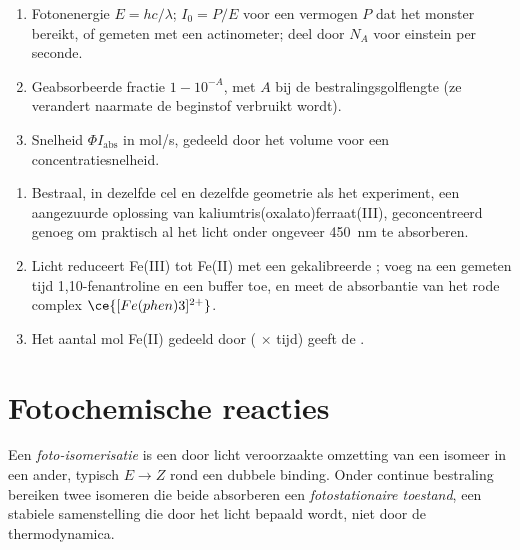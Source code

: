 \begin{method}\label{met:b3:photochemistry:photochemical-rate}
\begin{enumerate}
  \item Fotonenergie $E = hc/\lambda$;  $I_0 = P/E$ voor een
        vermogen $P$ dat het monster bereikt, of gemeten met een
        actinometer; deel door $N_A$ voor einstein per seconde.
  \item Geabsorbeerde fractie $1 - 10^{-A}$, met $A$ bij de
        bestralingsgolflengte (ze verandert naarmate de beginstof
        verbruikt wordt).
  \item Snelheid $\Phi I_{\mathrm{abs}}$ in mol/s, gedeeld door het volume
        voor een concentratiesnelheid.
\end{enumerate}
\end{method}

\begin{method}[Ferrioxalaatactinometrie]\label{met:b3:photochemistry:actinometry}
\begin{enumerate}
  \item Bestraal, in dezelfde cel en dezelfde geometrie als het experiment,
        een aangezuurde oplossing van kaliumtris(oxalato)ferraat(III),
        geconcentreerd genoeg om praktisch al het licht onder ongeveer
        \qty{450}{nm} te absorberen.
  \item Licht reduceert Fe(III) tot Fe(II) met een gekalibreerde
        ; voeg na een gemeten tijd 1,10-fenantroline en een
        buffer toe, en meet de absorbantie van het rode complex $\ce{[Fe(phen)3]^{2+}}$.
  \item Het aantal mol Fe(II) gedeeld door ( $\times$ tijd)
        geeft de .
\end{enumerate}
\end{method}

\section{Fotochemische reacties}

\begin{definition}\label{def:b3:photochemistry:photoisomerisation}
Een \emph{foto-isomerisatie} is een door licht
veroorzaakte omzetting van een isomeer in een ander, typisch $E \to Z$ rond een dubbele binding. Onder
continue bestraling bereiken twee isomeren die beide absorberen een
\emph{fotostationaire toestand}, een
stabiele samenstelling die door het licht bepaald wordt, niet door de
thermodynamica.
\end{definition}

